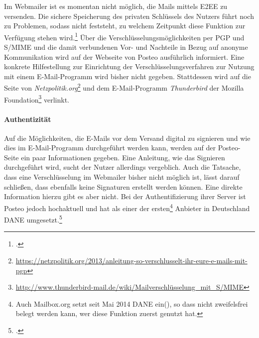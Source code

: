 \documentclass  [paper=a4,
				fontsize=12pt,
				listof=totoc,
				bibliography=totoc
				]{scrreprt}
\begin{document}
						Im Webmailer ist es momentan nicht möglich, die Mails mittels \ac{E2EE} zu versenden. Die sichere Speicherung des privaten Schlüssels des Nutzers führt noch zu Problemen, sodass nicht feststeht, zu welchem Zeitpunkt diese Funktion zur Verfügung stehen wird.\footcite[Vgl.][]{Posteo2013c}
						Über die Verschlüsselungsmöglichkeiten per \ac{PGP} und \ac{S/MIME} und die damit verbundenen Vor- und Nachteile in Bezug auf anonyme Kommunikation wird auf der Webseite von Posteo ausführlich informiert.
						Eine konkrete Hilfestellung zur Einrichtung der Verschlüsselungsverfahren zur Nutzung mit einem E-Mail-Programm wird bisher nicht gegeben.
						Stattdessen wird auf die Seite von \textit{Netzpolitik.org}\footnote{\url{https://netzpolitik.org/2013/anleitung-so-verschlusselt-ihr-eure-e-mails-mit-pgp}} und dem E-Mail-Programm \textit{Thunderbird} der Mozilla Foundation\footnote{\url{http://www.thunderbird-mail.de/wiki/Mailverschlüsselung_mit_S/MIME}} verlinkt.
					
					\paragraph{Authentizität}
						Auf die Möglichkeiten, die E-Mails vor dem Versand digital zu signieren und wie dies im E-Mail-Programm durchgeführt werden kann, werden auf der Posteo-Seite ein paar Informationen gegeben.
						Eine Anleitung, wie das Signieren durchgeführt wird, sucht der Nutzer allerdings vergeblich.
						Auch die Tatsache, dass eine Verschlüsselung im Webmailer bisher nicht möglich ist, lässt darauf schließen, dass ebenfalls keine Signaturen erstellt werden können.
						Eine direkte Information hierzu gibt es aber nicht.
						Bei der Authentifizierung ihrer Server ist Posteo jedoch hochaktuell und hat als einer der ersten\footnote{Auch Mailbox.org setzt seit Mai 2014 \ac{DANE} ein(\cite[Vgl.][]{Mailbox2014a}), so dass nicht zweifelsfrei belegt werden kann, wer diese Funktion zuerst genutzt hat.} Anbieter in Deutschland \ac{DANE} umgesetzt.\footcite[Vgl.][]{Zivadino14e}\medskip\\
					
\end{document}
